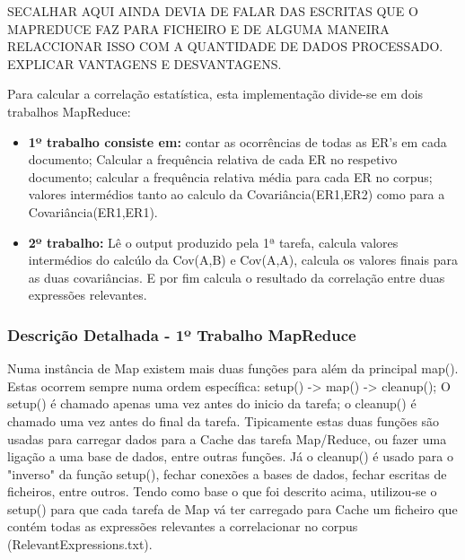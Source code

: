SECALHAR AQUI AINDA DEVIA DE FALAR DAS ESCRITAS QUE O MAPREDUCE FAZ PARA FICHEIRO E DE ALGUMA MANEIRA RELACCIONAR ISSO COM A QUANTIDADE DE DADOS PROCESSADO. EXPLICAR VANTAGENS E DESVANTAGENS.

Para calcular a correlação estatística, esta implementação divide-se em dois trabalhos MapReduce:
\begin{itemize}
    \item \textbf{1º trabalho consiste em: }contar as ocorrências de todas as ER's em cada documento; Calcular a frequência relativa de cada ER no respetivo documento; calcular a frequência relativa média para cada ER no corpus; valores intermédios tanto ao calculo da Covariância(ER1,ER2) como para a Covariância(ER1,ER1). 
    \item \textbf{2º trabalho: }Lê o output produzido pela 1ª tarefa, calcula valores intermédios do calcúlo da Cov(A,B) e Cov(A,A), calcula os valores finais para as duas covariâncias. E por fim calcula o resultado da correlação entre duas expressões relevantes. 
\end{itemize}

\subsubsection{Descrição Detalhada - 1º Trabalho MapReduce}
Numa instância de Map existem mais duas funções para além da principal map(). Estas ocorrem sempre numa ordem específica: setup() -> map() -> cleanup(); O setup() é chamado apenas uma vez antes do inicio da tarefa; o cleanup() é chamado uma vez antes do final da tarefa. Tipicamente estas duas funções são usadas para carregar dados para a Cache das tarefa Map/Reduce, ou fazer uma ligação a uma base de dados, entre outras funções. Já o cleanup() é usado para o "inverso" da função setup(), fechar conexões a bases de dados, fechar escritas de ficheiros, entre outros.
Tendo como base o que foi descrito acima, utilizou-se o setup() para que cada tarefa de Map vá ter carregado para Cache um ficheiro que contém todas as expressões relevantes a correlacionar no corpus (RelevantExpressions.txt).

